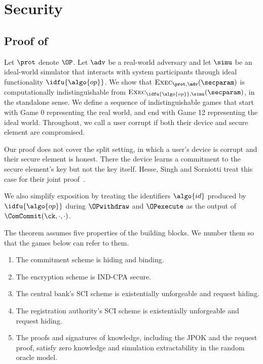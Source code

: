 \section{Security}\label{sec:offline-security}


\subsection{Proof of }\label{sec:offline-proof-1}

Let $\prot$ denote $\OP$. Let $\adv$ be a real-world adversary and let $\simu$ be an
ideal-world simulator that interacts with system participants through ideal
functionality $\idfu{\algo{op}}$. We show that
$\textsc{Exec}_{\prot,\adv}(\secparam)$ is computationally
indistinguishable from $\textsc{Exec}_{\idfu{\algo{op}},\simu}(\secparam)$, in
the standalone sense. We define a sequence of
indistinguishable games that start with Game 0 representing the real world, and
end with Game 12 representing the ideal world. Throughout, we call a user
corrupt if both their device and secure element are compromised.

Our proof does not cover the split setting, in which a user's device is corrupt
and their secure element is honest. There the
device learns a commitment to the secure element's key but not the key itself. Hesse, Singh and Sorniotti treat this case for their joint
proof~\cite{USENIX:HesSinSor23}.

We also simplify
exposition by treating the identifiers $\algo{id}$ produced by $\idfu{\algo{op}}$
during $\OPwithdraw$ and $\OPexecute$ as the output of $\ComCommit(\ck, \cdot,
\cdot)$.

The theorem assumes five properties of the building blocks. We number them so
that the games below can refer to them.

\begin{enumerate}

  \item[(P1)] The commitment scheme is hiding and binding.

  \item[(P2)] The encryption scheme is IND-CPA secure.

  \item[(P3)] The central bank's SCI scheme is existentially unforgeable
and request hiding.

  \item[(P4)] The registration authority's SCI scheme is existentially
unforgeable and request hiding.

  \item[(P5)] The proofs and signatures of knowledge, including the JPOK and the
request proof, satisfy zero knowledge and simulation extractability in the random oracle
model.

\end{enumerate}

